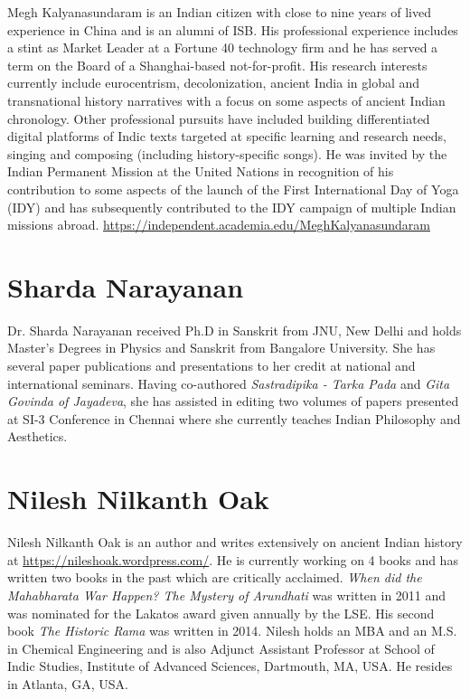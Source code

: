 Megh Kalyanasundaram is an Indian citizen with close to nine years of lived experience in China and is an alumni of ISB. His professional experience includes a stint as Market Leader at a Fortune 40 technology firm and he has served a term on the Board of a Shanghai-based not-for-profit. His research interests currently include eurocentrism, decolonization, ancient India in global and transnational history narratives with a focus on some aspects of ancient Indian chronology. Other professional pursuits have included building differentiated digital platforms of Indic texts targeted at specific learning and research needs, singing and composing (including history-specific songs). He was invited by the Indian Permanent Mission at the United Nations in recognition of his contribution to some aspects of the launch of the First International Day of Yoga (IDY) and has subsequently contributed to the IDY campaign of multiple Indian missions abroad. \url{https://independent.academia.edu/MeghKalyanasundaram}


\section*{Sharda Narayanan}

Dr. Sharda Narayanan received Ph.D in Sanskrit from JNU, New Delhi and holds Master's Degrees in Physics and Sanskrit from Bangalore University. She has several paper publications and presentations to her credit at national and international seminars. Having co-authored \textit{Sastradipika - Tarka Pada} and \textit{Gita Govinda of Jayadeva}, she has assisted in editing two volumes of papers presented at SI-3 Conference in Chennai where she currently teaches Indian Philosophy and Aesthetics.


\section*{Nilesh Nilkanth Oak}

Nilesh Nilkanth Oak is an author and writes extensively on ancient Indian history at \url{https://nileshoak.wordpress.com/}. He is currently working on 4 books and has written two books in the past which are critically acclaimed. \textit{When did the Mahabharata War Happen? The Mystery of Arundhati} was written in 2011 and was nominated for the Lakatos award given annually by the LSE. His second book \textit{The Historic Rama }was written in 2014. Nilesh holds an MBA and an M.S. in Chemical Engineering and is also Adjunct Assistant Professor at School of Indic Studies, Institute of Advanced Sciences, Dartmouth, MA, USA. He resides in Atlanta, GA, USA.



